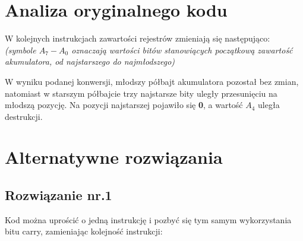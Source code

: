 \documentclass[a4paper,12pt]{extarticle}  %
\begin{document}
\section{Analiza oryginalnego kodu}

W kolejnych instrukcjach zawartości rejestrów zmieniają się następująco:\\
\emph{(symbole $A_7-A_0$ oznaczają wartości bitów stanowiących początkową zawartość akumulatora, od najstarszego do najmłodszego)}

\begin{table}[H]
	\centering
\end{table}
W wyniku podanej konwersji, młodszy półbajt akumulatora pozostał bez zmian, natomiast w starszym półbajcie trzy najstarsze bity uległy przesunięciu na młodszą pozycję.
Na pozycji najstarszej pojawiło się \textbf{0}, a wartość \textbf{$A_4$} uległa destrukcji.
\clearpage
\section{Alternatywne rozwiązania}
\subsection{Rozwiązanie nr.1}
Kod można uprościć o jedną instrukcję i pozbyć się tym samym wykorzystania bitu carry, zamieniając kolejność instrukcji:

\begin{table}[H]
	\centering
\end{table}
\end{document}
